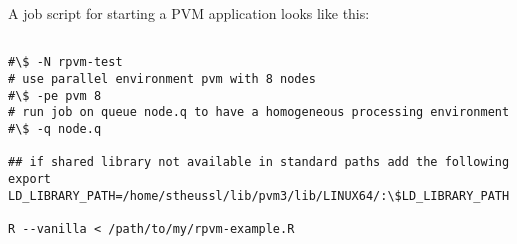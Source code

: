 A job script for starting a PVM application looks like this:

\begin{verbatim}

#\$ -N rpvm-test
# use parallel environment pvm with 8 nodes
#\$ -pe pvm 8 
# run job on queue node.q to have a homogeneous processing environment 
#\$ -q node.q

## if shared library not available in standard paths add the following
export LD_LIBRARY_PATH=/home/stheussl/lib/pvm3/lib/LINUX64/:\$LD_LIBRARY_PATH

R --vanilla < /path/to/my/rpvm-example.R

\end{verbatim}